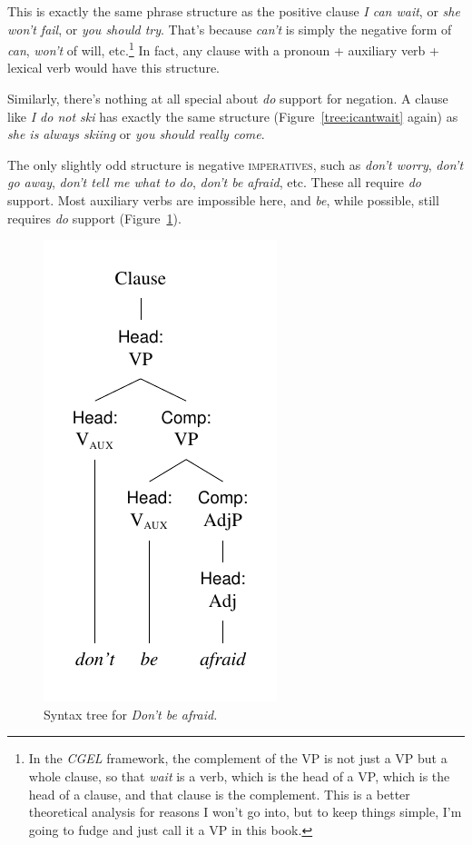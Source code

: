 This is exactly the same phrase structure as the positive clause \textit{I can wait}, or \textit{she won't fail}, or \textit{you should try}. That's because \textit{can't} is simply the negative form of \textit{can}, \textit{won't} of will, etc.\footnote{In the \textit{CGEL} framework, the complement of the VP is not just a VP but a whole clause, so that \textit{wait} is a verb, which is the head of a VP, which is the head of a clause, and that clause is the complement. This is a better theoretical analysis for reasons I won't go into, but to keep things simple, I'm going to fudge and just call it a VP in this book.} In fact, any clause with a pronoun + auxiliary verb + lexical verb would have this structure.

Similarly, there's nothing at all special about \textit{do} support for negation. A clause like \textit{I do not ski} has exactly the same structure (Figure~\ref{tree:icantwait} again) as \textit{she is always skiing} or \textit{you should really come}.

The only slightly odd structure is negative \textsc{imperatives}, such as \textit{don't worry}, \textit{don't go away}, \textit{don't tell me what to do}, \textit{don't be afraid}, etc. These all require \textit{do} support. Most auxiliary verbs are impossible here, and \textit{be}, while possible, still requires \textit{do} support (Figure~\ref{tree:dontbe}).

\begin{figure}
    \centering
    \includegraphics{figures/dontbe.pdf}
    \caption{Syntax tree for \textit{Don't be afraid.}}
    \label{tree:dontbe}
\end{figure}

